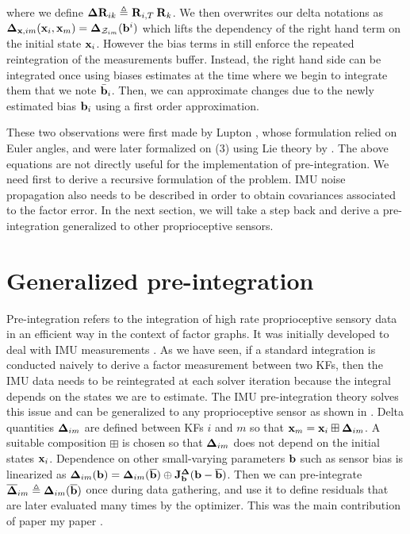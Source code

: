 %
where we define ${\bm \Delta {\bf R}}_{ik} \triangleq \prescript{}{}{{\bf R}}_{i,T} \prescript{}{}{{\bf R}}_{k}$.
We then overwrites our delta notations as ${\bm \Delta}_{{\bf x},im}({\bf x}_i, {\bf x}_m) = {\bm \Delta}_{\mathcal{Z}_{im}}({\bf b}^i)$
which lifts the dependency of the right hand term on the initial state ${\bf x}_i$. However the bias terms in  still enforce the repeated 
reintegration of the measurements buffer. Instead, the right hand side can be integrated once using biases estimates at the time where we begin to integrate them that
we note $\bar{{\bf b}}_i$. Then, we can approximate changes due to the newly estimated bias ${\bf b}_i$ using a first order approximation.

These two observations were first made by Lupton \cite{lupton-09}, whose formulation relied on Euler angles, and were later formalized on \SO(3) using Lie theory
by \cite{forster2017-TRO}. The above equations are not directly useful for the implementation of pre-integration. We need first to derive a recursive formulation 
of the problem. IMU noise propagation also needs to be described in order to obtain covariances associated to the factor error. In the next section, we will take 
a step back and derive a pre-integration generalized to other proprioceptive sensors.



\section{Generalized pre-integration}
\label{sec:general-preint}


Pre-integration refers to the integration of high rate proprioceptive sensory data in an efficient way in the context of factor graphs. 
It was initially developed to deal with IMU measurements \cite{lupton-09, forster2017-TRO}. 
As we have seen, if a standard integration is conducted naively to derive a factor measurement between two KFs, 
then the IMU data needs to be reintegrated at each solver iteration because the integral depends on the states we are to estimate. 
The IMU pre-integration theory solves this issue and can be generalized to any proprioceptive sensor as shown in \cite{atchuthan-18-thesis,deray-19-selfcalib,fourmy2021contact}. 
Delta quantities ${\bm \Delta}_{im}$  are defined between KFs $i$ and $m$ so that ${\bf x}_m={\bf x}_i\boxplus{\bm \Delta}_{im}$. A suitable composition $\boxplus$ is chosen so that ${\bm \Delta}_{im}$ 
does not depend on the initial states ${\bf x}_i$. 
Dependence on other small-varying parameters ${\bf b}$ such as sensor bias is linearized as ${\bm \Delta}_{im}({\bf b})={\bm \Delta}_{im}(\overline{{\bf b}})\oplus{\bf J}^{\bm \Delta}_{\bf b}({\bf b}-\overline{{\bf b}})$.
Then we can pre-integrate $\overline{{\bm \Delta}}_{im}\triangleq{\bm \Delta}_{im}(\overline{{\bf b}})$ once during data gathering, and use it to define residuals that are later evaluated many times by the optimizer.
This was the main contribution of paper my paper \cite{fourmy2021contact}.


